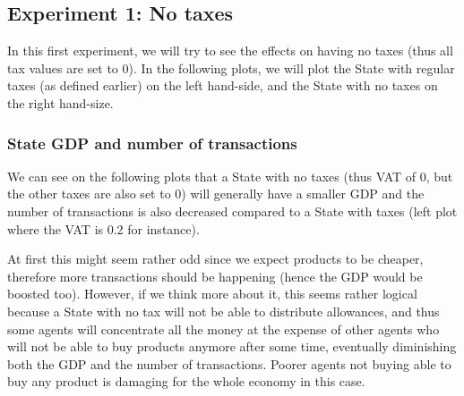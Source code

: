     \subsection{Experiment 1: No taxes}
    In this first experiment, we will try to see the effects on having no taxes (thus all tax values are set to 0). In the following plots, we will plot the State with regular taxes (as defined earlier) on the left hand-side, and the State with no taxes on the right hand-size. 

        \subsubsection{State GDP and number of transactions}

        We can see on the following plots that a State with no taxes (thus VAT of 0, but the other taxes are also set to 0) will generally have a smaller GDP and the number of transactions is also decreased compared to a State with taxes (left plot where the VAT is 0.2 for instance). 
        
        At first this might seem rather odd since we expect products to be cheaper, therefore more transactions should be happening (hence the GDP would be boosted too). However, if we think more about it, this seems rather logical because a State with no tax will not be able to distribute allowances, and thus some agents will concentrate all the money at the expense of other agents who will not be able to buy products anymore after some time, eventually diminishing both the GDP and the number of transactions. Poorer agents not buying able to buy any product is damaging for the whole economy in this case.

